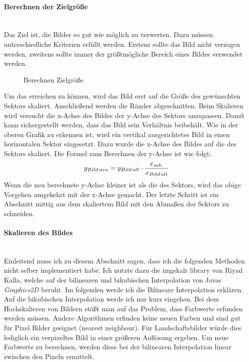 \newpage

\paragraph{Berechnen der Zielgröße}\mbox{}\\
Das Ziel ist, die Bilder so gut wie möglich zu verwerten. Dazu müssen unterschiedliche Kriterien erfüllt werden. Erstens sollte das Bild nicht verzogen werden, zweitens sollte immer der größtmögliche Bereich eines Bildes verwendet werden.

\begin{figure}[h]
    \centering
    \fontsize{12pt}{12pt}\selectfont%
    \def\svgwidth{12cm}
    
    \caption[Berechnen Zielgröße]{Berechnen Zielgröße}
\end{figure}

Um das erreichen zu können, wird das Bild erst auf die Größe des gewünschten Sektors skaliert. Anschließend werden die Ränder abgeschnitten. Beim Skalieren wird versucht die x-Achse des Bildes der y-Achse des Sektors anzupassen. Damit kann sichergestellt werden, dass das Bild sein Verhältnis beibehält. Wie in der oberen Grafik zu erkennen ist, wird ein vertikal ausgerichtetes Bild in einen horizontalen Sektor eingesetzt. Dazu wurde die x-Achse des Bildes auf die des Sektors skaliert. Die Formel zum Berechnen der y-Achse ist wie folgt.
\begin{align}
    y_\mathnormal{Bild\,neu}=y_\mathnormal{Bild\,alt} \cdot \frac{x_\mathnormal{sek.}}{x_\mathnormal{Bild\,alt}}
\end{align}    
Wenn die neu berechnete y-Achse kleiner ist als die des Sektors, wird das obige Vorgehen umgekehrt mit der x-Achse gemacht. Der letzte Schritt ist ein Abschnitt mittig aus dem skaliertem Bild mit den Abmaßen des Sektors zu schneiden.

\newpage

\paragraph{Skalieren des Bildes}\mbox{}\\
Einleitend muss ich zu diesem Abschnitt sagen, dass ich die folgenden Methoden nicht selber implementiert habe. Ich nutzte dazu die imgskalr library von Riyad Kalla, welche auf der bilinearen und bikubischen Interpolation von Javas \textit{Graphics2D} beruht.\cite{Scalr:Kalla} Im folgenden werde ich die Bilineare Interpolation erklären. Auf die bikubischen Interpolation werde ich nur kurz eingehen.
\medskip
\newline
Bei dem Hochskalieren von Bildern stößt man auf das Problem, dass Farbwerte erfunden werden müssen. Andere Algorithmen erfinden keine neuen Farben und sind gut für Pixel Bilder geeignet (nearest neighbour). Für Landschaftsbilder würde dies lediglich ein verpixeltes Bild in einer größeren Auflösung ergeben. Um neue Farbwerte zu berechnen, werden diese bei der bilinearen Interpolation linear zwischen den Pixeln ermittelt.

